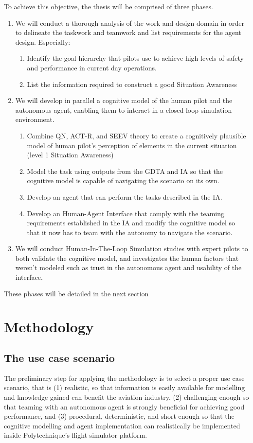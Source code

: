 \documentclass[12pt,a4paper]{article} %
\begin{document}
	To achieve this objective, the thesis will be comprised of three phases.
	\begin{enumerate}
		\item We will conduct a thorough analysis of the work and design domain in order to delineate the taskwork and teamwork and list requirements for the agent design. Especially:
		\begin{enumerate}
			\item Identify the goal hierarchy that pilots use to achieve high levels of safety and performance in current day operations.
			\item List the information required to construct a good Situation Awareness 
		\end{enumerate}
		\item We will develop in parallel a cognitive model of the human pilot and the autonomous agent, enabling them to interact in a closed-loop simulation environment. 
		\begin{enumerate}
			\item Combine QN, ACT-R, and SEEV theory to create a cognitively plausible model of human pilot's perception of elements in the current situation (level 1 Situation Awareness)
			\item Model the task using outputs from the GDTA and IA so that the cognitive model is capable of navigating the scenario on its own.
			\item Develop an agent that can perform the tasks described in the IA.
			\item Develop an Human-Agent Interface that comply with the teaming requirements established in the IA and modify the cognitive model so that it now has to team with the autonomy to navigate the scenario.
		\end{enumerate}  
		\item We will conduct Human-In-The-Loop Simulation studies with expert pilots to both validate the cognitive model, and investigates the human factors that weren't modeled such as trust in the autonomous agent and usability of the interface.
	\end{enumerate}
	These phases will be detailed in the next section 

	
	\section{Methodology} %
	\subsection{The use case scenario}
	The preliminary step for applying the methodology is to select a proper use case scenario, that is (1) realistic, so that information is easily available for modelling and knowledge gained can benefit the aviation industry, (2) challenging enough so that teaming with an autonomous agent is strongly beneficial for achieving good performance, and (3) procedural, deterministic, and short enough so that the cognitive modelling and agent implementation can realistically be implemented inside Polytechnique's flight simulator platform.
	
\end{document}
